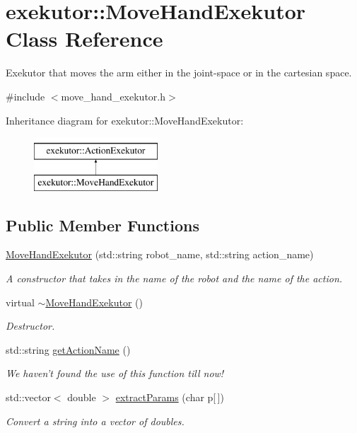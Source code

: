 \hypertarget{classexekutor_1_1MoveHandExekutor}{\section{exekutor\-:\-:\-Move\-Hand\-Exekutor \-Class \-Reference}
\label{classexekutor_1_1MoveHandExekutor}
}


\-Exekutor that moves the arm either in the joint-\/space or in the cartesian space.  




{\ttfamily \#include $<$move\-\_\-hand\-\_\-exekutor.\-h$>$}

\-Inheritance diagram for exekutor\-:\-:\-Move\-Hand\-Exekutor\-:\begin{figure}[H]
\begin{center}
\leavevmode
\includegraphics[height=2.000000cm]{classexekutor_1_1MoveHandExekutor}
\end{center}
\end{figure}
\subsection*{\-Public \-Member \-Functions}
\begin{DoxyCompactItemize}
\item 
\hyperlink{classexekutor_1_1MoveHandExekutor_a1a10a7d537f3d6c6c867e317ee426dc9}{\-Move\-Hand\-Exekutor} (std\-::string robot\-\_\-name, std\-::string action\-\_\-name)
\begin{DoxyCompactList}\small\item\em \-A constructor that takes in the name of the robot and the name of the action. \end{DoxyCompactList}\item 
virtual \hyperlink{classexekutor_1_1MoveHandExekutor_a7e3053b4862e9864c2dcf496698f5065}{$\sim$\-Move\-Hand\-Exekutor} ()
\begin{DoxyCompactList}\small\item\em \-Destructor. \end{DoxyCompactList}\item 
std\-::string \hyperlink{classexekutor_1_1ActionExekutor_a48d170d3931798f4019856fc0f070392}{get\-Action\-Name} ()
\begin{DoxyCompactList}\small\item\em \-We haven't found the use of this function till now! \end{DoxyCompactList}\item 
std\-::vector$<$ double $>$ \hyperlink{classexekutor_1_1ActionExekutor_af8ca9f59f077baad45a8cba4ab774e82}{extract\-Params} (char p\mbox{[}$\,$\mbox{]})
\begin{DoxyCompactList}\small\item\em \-Convert a string into a vector of doubles. \end{DoxyCompactList}\end{DoxyCompactItemize}
